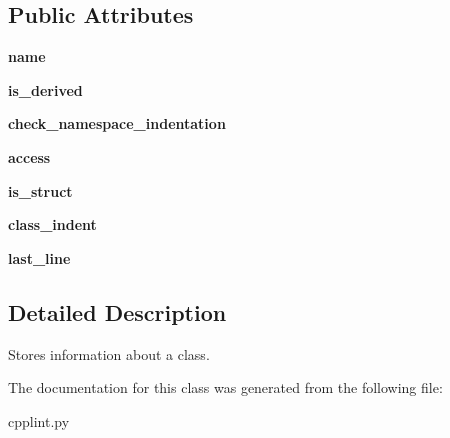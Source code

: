 \subsection*{Public Attributes}
\begin{DoxyCompactItemize}
\item 
\mbox{\label{classcpplint_1_1__ClassInfo_a3de5f207d3449d735d15ebca779fe336}} 
{\bfseries name}
\item 
\mbox{\label{classcpplint_1_1__ClassInfo_a8cace481686fbbb35a1da552646aa9f4}} 
{\bfseries is\+\_\+derived}
\item 
\mbox{\label{classcpplint_1_1__ClassInfo_a0ead95c17ac0b293d0d371eb7b414bd9}} 
{\bfseries check\+\_\+namespace\+\_\+indentation}
\item 
\mbox{\label{classcpplint_1_1__ClassInfo_aef1251c699b50c6603ce38ca8cce414c}} 
{\bfseries access}
\item 
\mbox{\label{classcpplint_1_1__ClassInfo_a57b443f42838d73183921d661b6fe4ef}} 
{\bfseries is\+\_\+struct}
\item 
\mbox{\label{classcpplint_1_1__ClassInfo_adc7d328734cc58fe46a3a3f323a09f4a}} 
{\bfseries class\+\_\+indent}
\item 
\mbox{\label{classcpplint_1_1__ClassInfo_a72e0f4576cdcb6f3886ed52e2affbc75}} 
{\bfseries last\+\_\+line}
\end{DoxyCompactItemize}


\subsection{Detailed Description}
\begin{DoxyVerb}Stores information about a class.\end{DoxyVerb}
 

The documentation for this class was generated from the following file\+:\begin{DoxyCompactItemize}
\item 
cpplint.\+py\end{DoxyCompactItemize}
